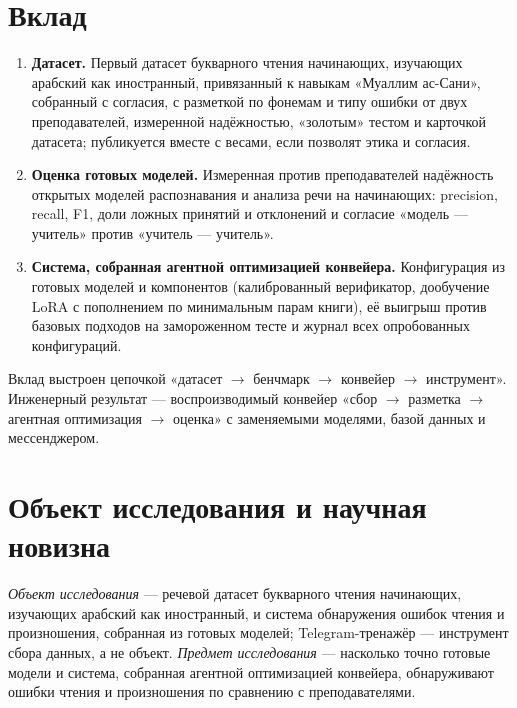 \section{Вклад}

\begin{enumerate}
  \item[\textbf{C1.}] \textbf{Датасет.} Первый датасет букварного чтения начинающих, изучающих арабский как
    иностранный, привязанный к навыкам «Муаллим ас-Сани», собранный с согласия, с разметкой по фонемам и
    типу ошибки от двух преподавателей, измеренной надёжностью, «золотым» тестом и карточкой
    датасета; публикуется вместе с весами, если позволят этика и согласия.
  \item[\textbf{C2.}] \textbf{Оценка готовых моделей.} Измеренная против преподавателей надёжность открытых
    моделей распознавания и анализа речи на начинающих: precision, recall, F1, доли ложных принятий и
    отклонений и согласие «модель --- учитель» против «учитель --- учитель».
  \item[\textbf{C3.}] \textbf{Система, собранная агентной оптимизацией конвейера.} Конфигурация из готовых моделей и
    компонентов (калиброванный верификатор, дообучение LoRA с пополнением по минимальным парам книги), её
    выигрыш против базовых подходов на замороженном тесте и журнал всех опробованных конфигураций.
\end{enumerate}

Вклад выстроен цепочкой «датасет $\to$ бенчмарк $\to$ конвейер $\to$ инструмент». Инженерный результат --- воспроизводимый конвейер «сбор $\to$ разметка $\to$ агентная оптимизация $\to$ оценка» с
заменяемыми моделями, базой данных и мессенджером.

\section{Объект исследования и научная новизна}\label{sec:novelty}

\emph{Объект исследования} --- речевой датасет букварного чтения начинающих, изучающих арабский как
иностранный, и система обнаружения ошибок чтения и произношения, собранная из готовых моделей;
Telegram-тренажёр --- инструмент сбора данных, а не объект. \emph{Предмет исследования} --- насколько точно
готовые модели и система, собранная агентной оптимизацией конвейера, обнаруживают ошибки чтения и произношения по
сравнению с преподавателями.

